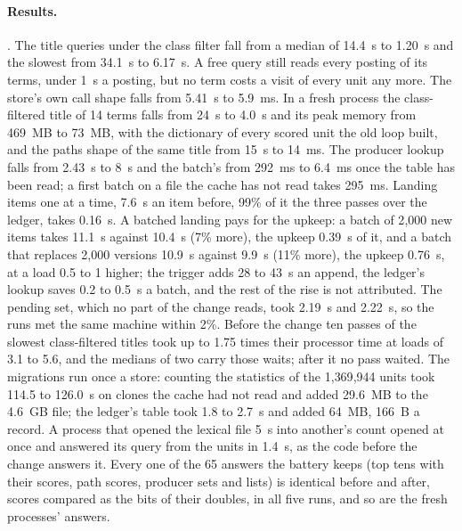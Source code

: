 \documentclass[11pt]{article}
\theoremstyle{plain}
\theoremstyle{definition}
\theoremstyle{remark}
\newcommand{\nUnits}{1{,}369{,}944}
\newcommand{\nAnswers}{65}
\newcommand{\kwBefore}{14.4}
\newcommand{\kwBeforeMax}{34.1}
\newcommand{\kwAfter}{1.20}
\newcommand{\kwAfterMax}{6.17}
\newcommand{\pathsBefore}{5.41}
\newcommand{\pathsAfter}{5.9}
\newcommand{\ledgerBefore}{2.43}
\newcommand{\ledgerAfter}{8}
\newcommand{\singleBefore}{7.6}
\newcommand{\singleAfter}{0.16}
\newcommand{\migrationLex}{114.5 to 126.0}
\begin{document}
\paragraph{Results.} . The title queries under the class filter fall from a
median of \kwBefore{}~s to \kwAfter{}~s and the slowest from \kwBeforeMax{}~s to \kwAfterMax{}~s.
A free query still reads every posting of its terms, under 1~\textmu s a posting, but no term
costs a visit of every unit any more. The store's own call shape falls from \pathsBefore{}~s to
\pathsAfter{}~ms. In a fresh process the class-filtered title of 14 terms falls from 24~s to 4.0~s
and its peak memory from 469~MB to 73~MB, with the dictionary of every scored unit the old loop
built, and the paths shape of the same title from 15~s to 14~ms. The producer lookup falls from
\ledgerBefore{}~s to \ledgerAfter{}~\textmu s and the batch's from 292~ms to 6.4~ms once the table
has been read; a first batch on a file the cache has not read takes 295~ms. Landing items one at a
time, \singleBefore{}~s an item before, 99\% of it the three passes over the ledger, takes
\singleAfter{}~s. A batched landing pays for the upkeep: a batch of 2{,}000 new items takes 11.1~s
against 10.4~s (7\% more), the upkeep 0.39~s of it, and a batch that replaces 2{,}000 versions
10.9~s against 9.9~s (11\% more), the upkeep 0.76~s, at a load 0.5 to 1 higher; the trigger adds
28 to 43~\textmu s an append, the ledger's lookup saves 0.2 to 0.5~s a batch, and the rest of the
rise is not attributed. The pending set, which no part of the change reads, took 2.19~s and 2.22~s,
so the runs met the same machine within 2\%. Before the change ten passes of the slowest
class-filtered titles took up to 1.75 times their processor time at loads of 3.1 to 5.6, and the
medians of two carry those waits; after it no pass waited. The migrations run once a store:
counting the statistics of the \nUnits{} units took \migrationLex{}~s on clones the cache had not
read and added 29.6~MB to the 4.6~GB file; the ledger's table took 1.8 to 2.7~s and added 64~MB,
166~B a record. A process that opened the lexical file 5~s into another's count opened at once
and answered its query from the units in 1.4~s, as the code before the change answers it. Every
one of the \nAnswers{} answers the battery keeps (top tens with their scores, path scores, producer
sets and lists) is identical before and after, scores compared as the bits of their doubles, in
all five runs, and so are the fresh processes' answers.
\end{document}
